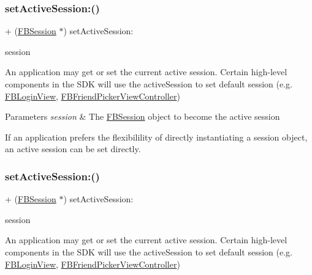 \subsubsection{\texorpdfstring{set\+Active\+Session\+:()}{setActiveSession:()}\hspace{0.1cm}{\footnotesize\ttfamily [1/5]}}
{\footnotesize\ttfamily + (\hyperlink{interfaceFBSession}{F\+B\+Session} $\ast$) set\+Active\+Session\+: \begin{DoxyParamCaption}\item[{(\hyperlink{interfaceFBSession}{F\+B\+Session} $\ast$)}]{session }\end{DoxyParamCaption}}

An application may get or set the current active session. Certain high-\/level components in the S\+DK will use the active\+Session to set default session (e.\+g. {\ttfamily \hyperlink{interfaceFBLoginView}{F\+B\+Login\+View}}, {\ttfamily \hyperlink{interfaceFBFriendPickerViewController}{F\+B\+Friend\+Picker\+View\+Controller}})


\begin{DoxyParams}{Parameters}
{\em session} & The \hyperlink{interfaceFBSession}{F\+B\+Session} object to become the active session\\
\hline
\end{DoxyParams}
If an application prefers the flexibilility of directly instantiating a session object, an active session can be set directly. \mbox{\label{interfaceFBSession_af1b30bea1e3251f8d75f76b10369756e}} 
\subsubsection{\texorpdfstring{set\+Active\+Session\+:()}{setActiveSession:()}\hspace{0.1cm}{\footnotesize\ttfamily [2/5]}}
{\footnotesize\ttfamily + (\hyperlink{interfaceFBSession}{F\+B\+Session} $\ast$) set\+Active\+Session\+: \begin{DoxyParamCaption}\item[{(\hyperlink{interfaceFBSession}{F\+B\+Session} $\ast$)}]{session }\end{DoxyParamCaption}}

An application may get or set the current active session. Certain high-\/level components in the S\+DK will use the active\+Session to set default session (e.\+g. {\ttfamily \hyperlink{interfaceFBLoginView}{F\+B\+Login\+View}}, {\ttfamily \hyperlink{interfaceFBFriendPickerViewController}{F\+B\+Friend\+Picker\+View\+Controller}})


